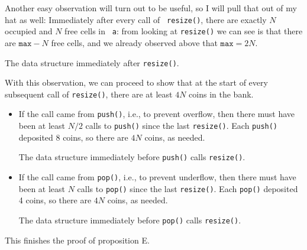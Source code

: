 \documentclass{tufte-handout}
\begin{document}
Another easy observation will turn out to be useful, so I will pull
that out of my hat as well:
 Immediately after every call of {\tt
  resize()}, there are exactly $N$ occupied and $N$ free cells in {\tt
  a}: from looking at {\tt resize()} we can see is that there are
$\mathtt{max}-N$ free cells, and we already observed above that
$\mathtt{max}=2N$.
\begin{marginfigure}
  \caption{The data structure immediately after {\tt resize()}.}
\end{marginfigure}



With this observation, we can proceed to show that at the start of
every subsequent call of {\tt resize()}, there are at least $4N$ coins
in the bank.
\begin{itemize}
\item If the call came from \texttt{push()}, i.e., to prevent
  overflow, then there must have been at least $N/2$ calls to
  \texttt{push()} since the last \texttt{resize()}. Each
  \texttt{push()} deposited 8 coins, so there are $4N$ coins, as
  needed.
\begin{marginfigure}
  \caption{The data structure immediately before \texttt{push()} calls
    \texttt{resize()}.}
\end{marginfigure}
\item If the call came from \texttt{pop()}, i.e., to prevent underflow,
  then there must have been at least $N$ calls to \texttt{pop()} since
  the last \texttt{resize()}. Each \texttt{pop()} deposited 4 coins,
  so there are $4N$ coins, as needed.
\begin{marginfigure}
  \caption{The data structure immediately before \texttt{pop()} calls {\tt resize()}.}
\end{marginfigure}
\end{itemize}
This finishes the proof of proposition E.
\end{document}
